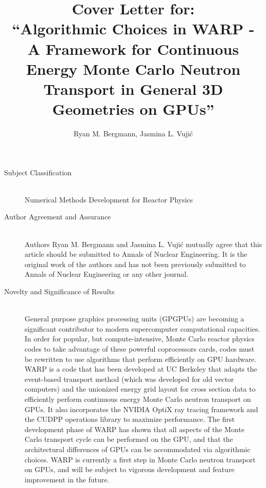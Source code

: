 \documentclass{article}
\begin{document}


\title{Cover Letter for: \\ ``Algorithmic Choices in WARP - A Framework for Continuous Energy Monte Carlo Neutron Transport in General 3D Geometries on GPUs''}
\author{Ryan M. Bergmann, Jasmina L. Vuji\'c}
\maketitle

\begin{description}
\item[Subject Classification] \hfill
\\
Numerical Methods Development for Reactor Physics

\item[Author Agreement and Assurance] \hfill
\\
Authors Ryan M. Bergmann and Jasmina L. Vuji\'c mutually agree that this article should be submitted to Annals of Nuclear Engineering.  It is the original work of the authors and has not been previously submitted to Annals of Nuclear Engineering or any other journal.

\item[Novelty and Significance of Results] \hfill
\\
General purpose graphics processing units (GPGPUs) are becoming a significant contributor to modern supercomputer computational capacities.  In order for popular, but compute-intensive, Monte Carlo reactor physics codes to take advantage of these powerful coprocessors cards, codes must be rewritten to use algorithms that perform efficiently on GPU hardware.  WARP is a code that has been developed at UC Berkeley that adapts the event-based transport method (which was developed for old vector computers) and the unionized energy grid layout for cross section data to efficiently perform continuous energy Monte Carlo neutron transport on GPUs.  It also incorporates the NVIDIA OptiX ray tracing framework and the CUDPP operations library to maximize performance.   The first development phase of WARP has shown that all aspects of the Monte Carlo transport cycle can be performed on the GPU, and that the architectural differences of GPUs can be accommodated via algorithmic choices.  WARP is currently a first step in Monte Carlo neutron transport on GPUs, and will be subject to vigorous development and feature improvement in the future.  

\end{description}
\end{document}
